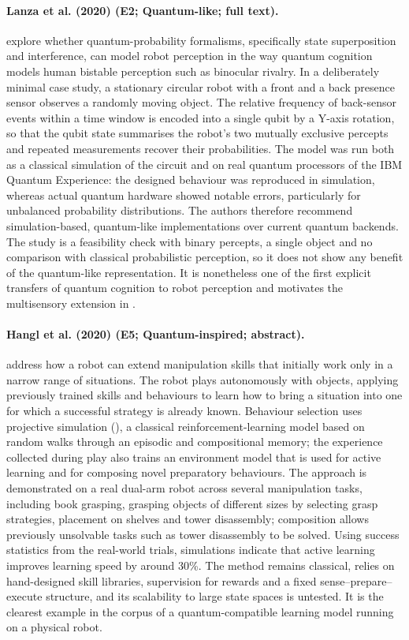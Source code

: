 \documentclass[10pt,a4paper]{article}
\begin{document}
\paragraph{Lanza et al. (2020) (E2; Quantum-like; full text).} \citet{Lanza2020} explore whether quantum-probability formalisms, specifically state superposition and interference, can model robot perception in the way quantum cognition models human bistable perception such as binocular rivalry. In a deliberately minimal case study, a stationary circular robot with a front and a back presence sensor observes a randomly moving object. The relative frequency of back-sensor events within a time window is encoded into a single qubit by a Y-axis rotation, so that the qubit state summarises the robot's two mutually exclusive percepts and repeated measurements recover their probabilities. The model was run both as a classical simulation of the circuit and on real quantum processors of the IBM Quantum Experience: the designed behaviour was reproduced in simulation, whereas actual quantum hardware showed notable errors, particularly for unbalanced probability distributions. The authors therefore recommend simulation-based, quantum-like implementations over current quantum backends. The study is a feasibility check with binary percepts, a single object and no comparison with classical probabilistic perception, so it does not show any benefit of the quantum-like representation. It is nonetheless one of the first explicit transfers of quantum cognition to robot perception and motivates the multisensory extension in \citep{Lanza2021}.

\paragraph{Hangl et al. (2020) (E5; Quantum-inspired; abstract).} \citet{Hangl2020} address how a robot can extend manipulation skills that initially work only in a narrow range of situations. The robot plays autonomously with objects, applying previously trained skills and behaviours to learn how to bring a situation into one for which a successful strategy is already known. Behaviour selection uses projective simulation (\citep{Briegel2012}), a classical reinforcement-learning model based on random walks through an episodic and compositional memory; the experience collected during play also trains an environment model that is used for active learning and for composing novel preparatory behaviours. The approach is demonstrated on a real dual-arm robot across several manipulation tasks, including book grasping, grasping objects of different sizes by selecting grasp strategies, placement on shelves and tower disassembly; composition allows previously unsolvable tasks such as tower disassembly to be solved. Using success statistics from the real-world trials, simulations indicate that active learning improves learning speed by around 30\%. The method remains classical, relies on hand-designed skill libraries, supervision for rewards and a fixed sense--prepare--execute structure, and its scalability to large state spaces is untested. It is the clearest example in the corpus of a quantum-compatible learning model running on a physical robot.
\end{document}

